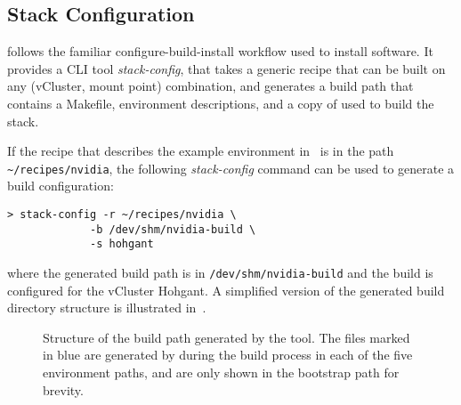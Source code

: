 \subsection{Stack Configuration}

\stackinator follows the familiar configure-build-install workflow used to install software.
It provides a CLI tool \emph{stack-config}, that takes a generic recipe that can be built on any (vCluster, mount point) combination, and generates a build path that contains a Makefile, \spack environment descriptions, and a copy of \spack used to build the stack.

If the recipe that describes the example environment in~ is in the path \lstinline{~/recipes/nvidia}, the following \emph{stack-config} command can be used to generate a build configuration:
\begin{lstlisting}
> stack-config -r ~/recipes/nvidia \
             -b /dev/shm/nvidia-build \
             -s hohgant
\end{lstlisting}
where the generated build path is in \lstinline{/dev/shm/nvidia-build} and the build is configured for the vCluster Hohgant.
A simplified version of the generated build directory structure is illustrated in~.

\begin{figure}[htp!]
    
    \caption{Structure of the build path generated by the \stackinator tool. The files marked in blue are generated by \spack during the build process in each of the five environment paths, and are only shown in the bootstrap path for brevity.}
    \label{fig:build-tree}
\end{figure}

